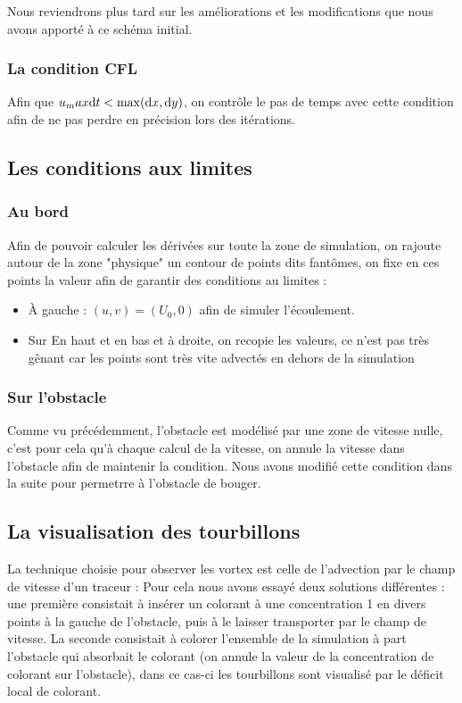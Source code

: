 		Nous reviendrons plus tard sur les améliorations et les modifications que nous avons apporté à ce schéma initial.		
		
		\subsubsection{La condition CFL}
		
			Afin que $u_max \mathrm{d}t < \max(\mathrm{d}x, \mathrm{d}y)$, on contrôle le pas de temps avec cette condition afin de ne pas perdre en précision lors des itérations.
		
		
	\subsection{Les conditions aux limites}
		
		\subsubsection{Au bord}
			Afin de pouvoir calculer les dérivées sur toute la zone de simulation, on rajoute autour de la zone "physique" un contour de points dits fantômes, on fixe en ces points la valeur afin de garantir des conditions au limites : 
			\begin{itemize}
				\item À gauche : $(u,v) = (U_0,0)$ afin de simuler l'écoulement.
				\item Sur En haut et en bas et à droite, on recopie les valeurs, ce n'est pas très gênant car les points sont très vite advectés en dehors de la simulation
			\end{itemize}
		
		\subsubsection{Sur l'obstacle}

			Comme vu précédemment, l'obstacle est modélisé par une zone de vitesse nulle, c'est pour cela qu'à chaque calcul de la vitesse, on annule la vitesse dans l'obstacle afin de maintenir la condition. Nous avons modifié cette condition dans la suite pour permetrre à l'obstacle de bouger.

	\subsection{La visualisation des tourbillons}
	
		La technique choisie pour observer les vortex est celle de l'advection par le champ de vitesse d'un traceur : Pour cela nous avons essayé deux solutions différentes : une première consistait à insérer un colorant à une concentration 1 en divers points à la gauche de l'obstacle, puis à le laisser transporter par le champ de vitesse. La seconde consistait à colorer l'ensemble de la simulation à part l'obstacle qui absorbait le colorant (on annule la valeur de la concentration de colorant sur l'obstacle), dans ce cas-ci les tourbillons sont visualisé par le déficit local de colorant.
		
